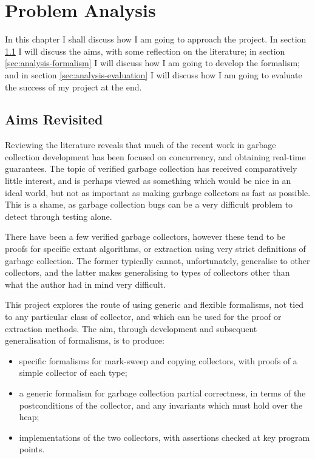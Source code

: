 \chapter{Problem Analysis}
\label{sec:analysis}

In this chapter I shall discuss how I am going to approach the
project. In section \ref{sec:analysis-aims} I will discuss the aims,
with some reflection on the literature; in section
\ref{sec:analysis-formalism} I will discuss how I am going to develop
the formalism; and in section \ref{sec:analysis-evaluation} I will
discuss how I am going to evaluate the success of my project at the
end.

\section{Aims Revisited}
\label{sec:analysis-aims}

Reviewing the literature reveals that much of the recent work in
garbage collection development has been focused on concurrency, and
obtaining real-time guarantees. The topic of verified garbage
collection has received comparatively little interest, and is perhaps
viewed as something which would be nice in an ideal world, but not as
important as making garbage collectors as fast as possible. This is a
shame, as garbage collection bugs can be a very difficult problem to
detect through testing alone.

There have been a few verified garbage collectors, however these tend
to be proofs for specific extant algorithms, or extraction using very
strict definitions of garbage collection. The former typically cannot,
unfortunately, generalise to other collectors, and the latter makes
generalising to types of collectors other than what the author had in
mind very difficult.

This project explores the route of using generic and flexible
formalisms, not tied to any particular class of collector, and which
can be used for the proof or extraction methods. The aim, through
development and subsequent generalisation of formalisms, is to
produce:

\begin{itemize}
  \item specific formalisms for mark-sweep and copying collectors,
    with proofs of a simple collector of each type;

  \item a generic formalism for garbage collection partial
    correctness, in terms of the postconditions of the collector, and
    any invariants which must hold over the heap;

  \item implementations of the two collectors, with assertions checked
    at key program points.
\end{itemize}

